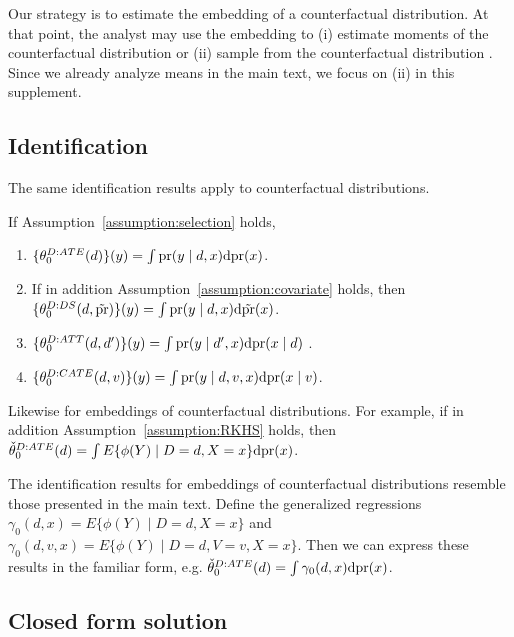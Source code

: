 Our strategy is to estimate the embedding of a  counterfactual distribution. At that point, the analyst may use the embedding to (i) estimate moments of the counterfactual distribution \cite{kanagawa2014recovering} or (ii) sample from the counterfactual distribution \cite{welling2009herding}. Since we already analyze means in the main text, we focus on (ii) in this supplement.

\subsection{Identification}

The same identification results apply to counterfactual distributions.

\begin{lemma}\label{theorem:id_treatment_dist}
If Assumption~\ref{assumption:selection} holds,
\begin{enumerate}
     \item $\{\theta_0^{D:ATE}(d)\}(y)=\int \text{\normalfont pr}(y \mid d,x)\mathrm{d}\text{\normalfont pr}(x)$.
    \item If in addition Assumption~\ref{assumption:covariate} holds, then $\{\theta_0^{D:DS}(d,\tilde{\text{\normalfont pr}})\}(y)=\int \text{\normalfont pr}(y \mid d,x)\mathrm{d}\tilde{\text{\normalfont pr}}(x)$.
    \item $\{\theta_0^{D:ATT}(d,d')\}(y)=\int \text{\normalfont pr}(y \mid d',x)\mathrm{d}\text{\normalfont pr}(x \mid d)$ \cite{chernozhukov2013inference}.
    \item $\{\theta_0^{D:CATE}(d,v)\}(y)=\int \text{\normalfont pr}(y \mid d,v,x)\mathrm{d}\text{\normalfont pr}(x \mid v)$.
\end{enumerate}
Likewise for embeddings of counterfactual distributions. For example, if in addition Assumption~\ref{assumption:RKHS} holds, then $\check{\theta}_0^{D:ATE}(d)=\int E\{\phi(Y) \mid D=d,X=x\}\mathrm{d}\text{\normalfont pr}(x)
$.
\end{lemma}
The identification results for embeddings of counterfactual distributions resemble those presented in the main text. Define the generalized regressions
$
\gamma_0(d,x)=E\{\phi(Y) \mid D=d,X=x\}
$ and $\gamma_0(d,v,x)=E\{\phi(Y) \mid D=d,V=v,X=x\}$. Then we can express these results in the familiar form, e.g. $\check{\theta}_0^{D:ATE}(d)=\int \gamma_0(d,x)\mathrm{d}\text{\normalfont pr}(x)$.

\subsection{Closed form solution}


